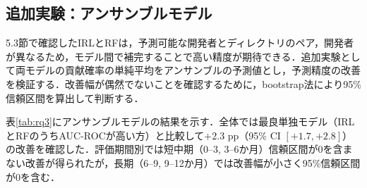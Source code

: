 \documentclass[submit,noauthor,ses,dvipdfmx]{ipsj}
\newcommand{\todo}[1]{\colorbox{yellow}{{\bf TODO}:}{\color{red} {\textbf{[#1]}}}}
\begin{document}






\subsection{追加実験：アンサンブルモデル}
5.3節で確認したIRLとRFは，予測可能な開発者とディレクトリのペア，開発者が異なるため，モデル間で補完することで高い精度が期待できる．追加実験として両モデルの貢献確率の単純平均をアンサンブルの予測値とし，予測精度の改善を検証する．改善幅が偶然でないことを確認するために，bootstrap法により95\%信頼区間を算出して判断する．


表\ref{tab:rq3}にアンサンブルモデルの結果を示す．全体では最良単独モデル（IRLとRFのうちAUC-ROCが高い方）と比較して$+2.3$ pp（95\% CI $[+1.7, +2.8]$）の改善を確認した．評価期間別では短中期（0--3, 3--6か月）信頼区間が0を含まない改善が得られたが，長期（6--9, 9--12か月）では改善幅が小さく95\%信頼区間が0を含む．
\end{document}

